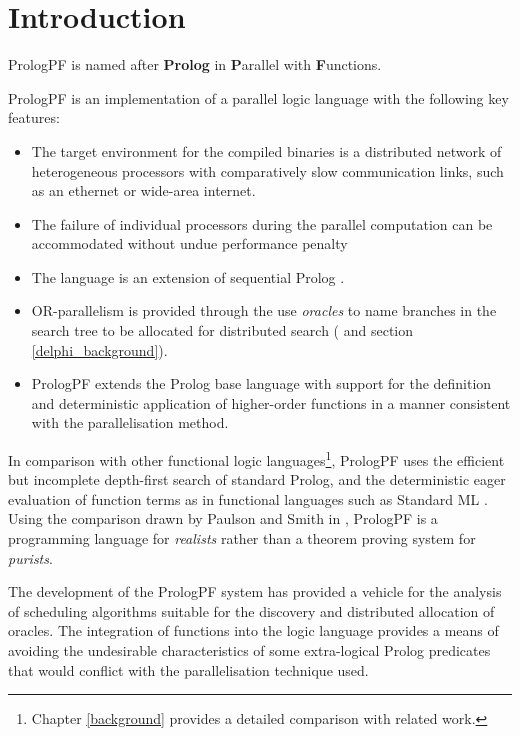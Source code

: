 \chapter{Introduction}
\label{intro}

PrologPF is named after \textbf{Prolog} in \textbf{P}arallel with
\textbf{F}unctions.

PrologPF is an implementation of a parallel logic language with the
following key features:
\begin{itemize}
\item{The target environment for the compiled binaries is a distributed
  network of heterogeneous processors with comparatively slow communication
  links, such as an ethernet or wide-area internet.}
\item{The failure of individual processors during the parallel computation
  can be accommodated without undue performance penalty}
\item{The language is an extension of sequential Prolog \cite{DEDC96}.}
\item{OR-parallelism is provided through the use \textit{oracles}
  to name branches
  in the search tree to be allocated for distributed search
  (\cite{CA87} and section \ref{delphi_background}).}
\item{PrologPF extends the Prolog base language with
  support for the definition and deterministic
  application of higher-order functions
  in a manner consistent with the parallelisation method.}
\end{itemize}

In comparison with other functional logic languages\footnote{Chapter
\ref{background} provides a detailed comparison with related work.},
PrologPF uses the efficient but incomplete
depth-first search of standard Prolog, and the deterministic eager
evaluation of function terms as in functional languages such as
Standard ML \cite{MTH90}.  Using the comparison drawn by Paulson and
Smith in \cite{PS91},  PrologPF is a programming language for
\textit{realists} rather than 
a theorem proving system for \textit{purists}.

The development of the PrologPF system has provided a vehicle for the
analysis of scheduling algorithms suitable for the discovery and 
distributed allocation of
oracles.
The integration of functions into the
logic language provides a means of avoiding the undesirable
characteristics of some extra-logical Prolog predicates that would conflict with
the parallelisation technique used.

